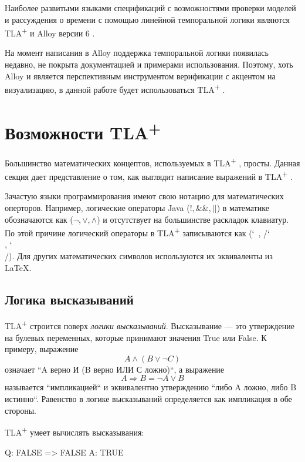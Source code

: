 \documentclass[14pt, openany]{book}
\newcommand{\tlapl}{TLA\textsuperscript{+} }
\begin{document}
Наиболее развитыми языками спецификаций с возможностями проверки моделей и рассуждения о времени с помощью линейной темпоральной логики являются \tlapl \cite{tla} и Alloy версии 6 \cite{alloy}.

На момент написания в Alloy поддержка темпоральной логики появилась недавно, не покрыта документацией и примерами использования. Поэтому, хоть Alloy и является перспективным инструментом верификации с акцентом на визуализацию, в данной работе будет использоваться \tlapl.

\section{Возможности \tlapl}
Большинство математических концептов, используемых в \tlapl, просты. Данная секция дает представление о том, как выглядит написание выражений в \tlapl. 

Зачастую языки программирования имеют свою нотацию для математических оперторов. Например, логические операторы Java (\(!, \&\&, ||\)) в математике обозначаются как (\(\neg, \lor, \land\)) и отсутствует на большинстве раскладок клавиатур. По этой причине логический операторы в \tlapl записываются как (\char`~, /\char`\\, \char`\\/). Для других математических символов используются их эквиваленты из LaTeX.

\subsection{Логика высказываний}

\tlapl строится поверх \emph{логики высказываний}. Высказывание --- это утверждение на булевых переменных, которые принимают значения True или False. К примеру, выражение 
\[A \land (B \lor \neg C)\]
означает ``A верно И (B верно ИЛИ С ложно)``, а выражение
\[A \Rightarrow B = \neg A \lor B\]
называется ``импликацией`` и эквивалентно утверждению ``либо A ложно, либо B истинно``. Равенство в логике высказываний определяется как импликация в обе стороны.

\tlapl умеет вычислять высказывания:
\begin{tla}
  Q: FALSE => FALSE
  A: TRUE
\end{tla}
\begin{tlatex}
%
%
\end{tlatex}
\end{document}
